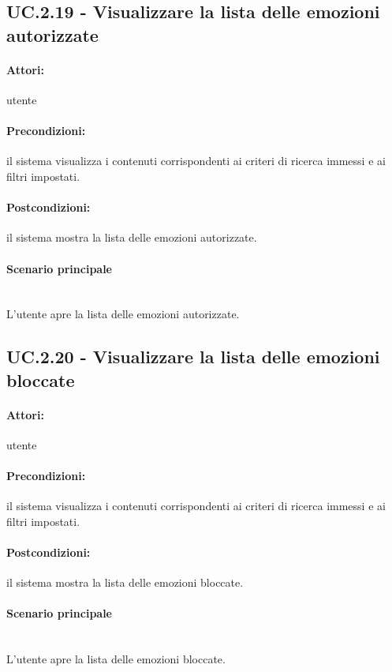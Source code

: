 \documentclass[10pt,a4paper,headinclude,footinclude,hidelinks]{scrreprt} %
\begin{document}
	\subsection[UC.2.19]{UC.2.19 - Visualizzare la lista delle emozioni autorizzate}
	\label{sec:stage:ar:uc:2_19}
	\paragraph{Attori:} utente
	\paragraph{Precondizioni:} il sistema visualizza i contenuti corrispondenti ai criteri di ricerca immessi e ai filtri impostati.
	\paragraph{Postcondizioni:} il sistema mostra la lista delle emozioni autorizzate.
	\paragraph{Scenario principale} \hfill \\
	L'utente apre la lista delle emozioni autorizzate.

	\subsection[UC.2.20]{UC.2.20 - Visualizzare la lista delle emozioni bloccate}
	\label{sec:stage:ar:uc:2_20}
	\paragraph{Attori:} utente
	\paragraph{Precondizioni:} il sistema visualizza i contenuti corrispondenti ai criteri di ricerca immessi e ai filtri impostati.
	\paragraph{Postcondizioni:} il sistema mostra la lista delle emozioni bloccate.
	\paragraph{Scenario principale} \hfill \\
	L'utente apre la lista delle emozioni bloccate.
\end{document}

